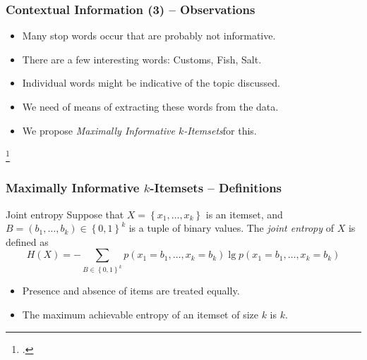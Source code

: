 \documentclass[12pt]{beamer}
\theoremstyle{break}
\begin{document}


\begin{frame}
	\frametitle{Contextual Information (3) -- Observations}

	\begin{itemize}
		\item Many \alert{stop words} occur that are probably not informative.
		\item There are a few interesting words: Customs, Fish, Salt.
		\item Individual words might be indicative of the \alert{topic} discussed.
		\item We need of means of extracting these words from the data.
		\item We propose \emph{Maximally Informative $k$-Itemsets}\footnotemark for this.
	\end{itemize}
	
	\footcitetext{Knobbe2006}
	
\end{frame}




\begin{frame}
	\frametitle{Maximally Informative $k$-Itemsets -- Definitions}
	
	\begin{block}{Joint entropy}
    	Suppose that $X = \left\{ x_{1}, \dots, x_{k} \right\}$ is an itemset, and $B = \left( b_{1}, \dots, b_{k} \right) \in \left\{ 0, 1 \right\}^{k}$ is a tuple of binary values. The \emph{joint entropy} of $X$ is defined as
    	\small
    	\begin{equation*}
        	H(X) = -\sum_{B \in \left\{ 0, 1 \right\}^{k}} p \left( x_{1} = b_{1}, \dots, x_{k} = b_{k} \right) \lg p \left( x_{1} = b_{1}, \dots, x_{k} = b_{k} \right)
    	\end{equation*}
    	\normalsize
	\end{block}
	
	\pause
	
	\begin{itemize}
		\item Presence and absence of items are treated equally.
		\item The maximum achievable entropy of an itemset of size $k$ is $k$.
	\end{itemize}

\end{frame}


\end{document}
